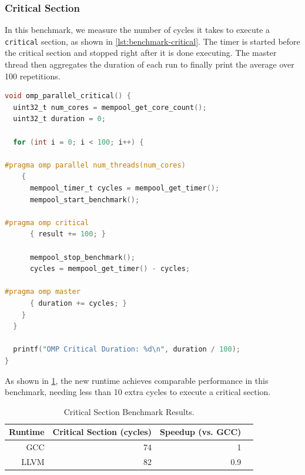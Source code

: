 \subsubsection{Critical Section}

In this benchmark, we measure the number of cycles it takes to execute a \texttt{critical} section,
as shown in \cref{lst:benchmark-critical}. The timer is started before the critical section and
stopped right after it is done executing. The master thread then aggregates the duration of each run
to finally print the average over 100 repetitions.

\begin{lstlisting}[language=C, caption={Critical Benchmark},
                   label={lst:benchmark-critical}]
void omp_parallel_critical() {
  uint32_t num_cores = mempool_get_core_count();
  uint32_t duration = 0;

  for (int i = 0; i < 100; i++) {

#pragma omp parallel num_threads(num_cores)
    {
      mempool_timer_t cycles = mempool_get_timer();
      mempool_start_benchmark();

#pragma omp critical
      { result += 100; }

      mempool_stop_benchmark();
      cycles = mempool_get_timer() - cycles;

#pragma omp master
      { duration += cycles; }
    }
  }

  printf("OMP Critical Duration: %d\n", duration / 100);
}
\end{lstlisting}

As shown in \cref{tbl:critical}, the new runtime achieves comparable performance in this benchmark,
needing less than 10 extra cycles to execute a critical section.

\begin{table}[h]
	\centerfloat
	\begin{tabular}{ r r r r }
		\toprule
		\textbf{Runtime} & \textbf{Critical Section (cycles)} & \textbf{Speedup (vs. GCC)} \\
		\midrule
		GCC              & 74                                 & 1                          \\
		LLVM             & 82                                 & 0.9                        \\
		\bottomrule
	\end{tabular}
	\caption{Critical Section Benchmark Results.}%
	\label{tbl:critical}
\end{table}

